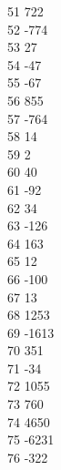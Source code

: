 { 51	722 \\
 52	-774 \\
 53	27 \\
 54	-47 \\
 55	-67 \\
 56	855 \\
 57	-764 \\
 58	14 \\
 59	2 \\
 60	40 \\
 61	-92 \\
 62	34 \\
 63	-126 \\
 64	163 \\
 65	12 \\
 66	-100 \\
 67	13 \\
 68	1253 \\
 69	-1613 \\
 70	351 \\
 71	-34 \\
 72	1055 \\
 73	760 \\
 74	4650 \\
 75	-6231 \\
 76	-322 \\
}
